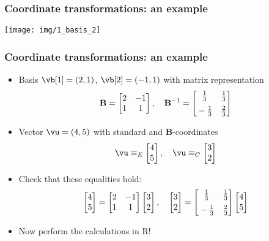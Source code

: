 \begin{frame}[c]
  \frametitle{Coordinate transformations: an example}

  \begin{center}
    \texttt{[image: img/1\_basis\_2]}
  \end{center}
\end{frame}

\begin{frame}
  \frametitle{Coordinate transformations: an example}

  \begin{itemize}
  \item Basis $\vb[1] = (2,1)$, $\vb[2] = (-1,1)$ with matrix representation
    \[ 
    \mathbf{B} = \begin{bmatrix}
      2 & -1 \\ 1 & 1
    \end{bmatrix},
    \quad
    \mathbf{B}^{-1} = \begin{bmatrix}
      \frac{1}{3} & \frac{1}{3} \\ \rule{0mm}{1.4em}-\frac{1}{3} & \frac{2}{3}
    \end{bmatrix}
    \]
    \pause
  \item Vector $\vu = (4,5)$ with standard and $\mathbf{B}$-coordinates
    \[
    \vu \equiv_E \begin{bmatrix}
      4 \\ 5
    \end{bmatrix},
    \quad
    \vu \equiv_C \begin{bmatrix}
      3 \\ 2
    \end{bmatrix}
    \]
    \pause
  \item Check that these equalities hold:
    \[
    \begin{bmatrix}
      4 \\ 5
    \end{bmatrix}
    =
    \begin{bmatrix}
      2 & -1 \\ 1 & 1
    \end{bmatrix}
    \begin{bmatrix}
      3 \\ 2
    \end{bmatrix},
    \quad
    \begin{bmatrix}
      3 \\ 2
    \end{bmatrix}
    =
    \begin{bmatrix}
      \frac{1}{3} & \frac{1}{3} \\ \rule{0mm}{1.4em}-\frac{1}{3} & \frac{2}{3}
    \end{bmatrix}  
    \begin{bmatrix}
      4 \\ 5
    \end{bmatrix}
    \]
    \pause
  \item Now perform the calculations in R!
  \end{itemize}
\end{frame}

